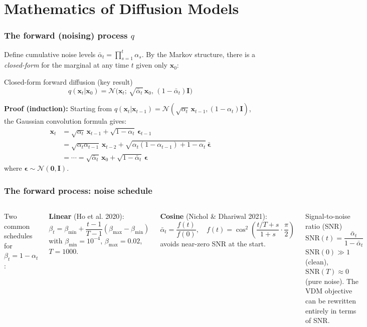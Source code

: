 \documentclass{beamer}
\newcommand{\Norm}{\mathcal{N}}
\begin{document}
\section{Mathematics of Diffusion Models}

\begin{frame}
\frametitle{The forward (noising) process $q$}

Define cumulative noise levels $\bar\alpha_t = \prod_{s=1}^{t}\alpha_s$.
By the Markov structure, there is a \emph{closed-form} for the marginal at
any time $t$ given only $\bm{x}_0$:

\begin{block}{Closed-form forward diffusion (key result)}
\[
\boxed{q(\bm{x}_t|\bm{x}_0)
= \Norm\!\bigl(\bm{x}_t;\,\sqrt{\bar\alpha_t}\,\bm{x}_0,\,
  (1-\bar\alpha_t)\mathbf{I}\bigr)}
\]
\end{block}

\textbf{Proof (induction):}
Starting from $q(\bm{x}_t|\bm{x}_{t-1})=\Norm(\sqrt{\alpha_t}\,\bm{x}_{t-1},(1-\alpha_t)\mathbf{I})$,
the Gaussian convolution formula gives:
\begin{align*}
  \bm{x}_t
  &= \sqrt{\alpha_t}\,\bm{x}_{t-1} + \sqrt{1-\alpha_t}\,\bm{\epsilon}_{t-1}\\
  &= \sqrt{\alpha_t\alpha_{t-1}}\,\bm{x}_{t-2}
     + \sqrt{\alpha_t(1-\alpha_{t-1})+1-\alpha_t}\,\bar{\bm{\epsilon}}\\
  &= \cdots = \sqrt{\bar\alpha_t}\,\bm{x}_0 + \sqrt{1-\bar\alpha_t}\,\bm{\epsilon}
\end{align*}
where $\bm{\epsilon}\sim\Norm(\bm{0},\mathbf{I})$.
\end{frame}

\begin{frame}
\frametitle{The forward process: noise schedule}

\begin{columns}
Two common schedules for $\beta_t = 1-\alpha_t$:

\textbf{Linear} (Ho et al. 2020):
\[
  \beta_t = \beta_{\min} + \frac{t-1}{T-1}(\beta_{\max}-\beta_{\min})
\]
with $\beta_{\min}=10^{-4}$, $\beta_{\max}=0.02$, $T=1000$.

\textbf{Cosine} (Nichol \& Dhariwal 2021):
\[
  \bar\alpha_t = \frac{f(t)}{f(0)},\quad
  f(t) = \cos^2\!\!\left(\frac{t/T + s}{1+s}\cdot\frac{\pi}{2}\right)
\]
avoids near-zero SNR at the start.

\begin{block}{Signal-to-noise ratio (SNR)}
\[
\mathrm{SNR}(t) = \frac{\bar\alpha_t}{1-\bar\alpha_t}
\]
$\mathrm{SNR}(0)\gg 1$ (clean), $\mathrm{SNR}(T)\approx 0$ (pure noise).
The VDM objective can be rewritten entirely in terms of SNR.
\end{block}
\end{columns}
\end{frame}
\end{document}

